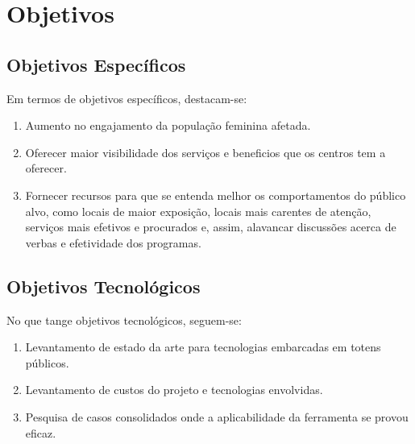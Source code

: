 \section{Objetivos}
\vspace*{1cm}
\subsection{Objetivos Específicos}
Em termos de objetivos específicos, destacam-se:
\begin{enumerate}
\item Aumento no engajamento da população feminina afetada.
\item Oferecer maior visibilidade dos serviços e beneficios que os centros tem a oferecer.
\item Fornecer recursos para que se entenda melhor os comportamentos do público alvo, como locais de maior exposição, locais mais carentes de atenção, serviços mais efetivos e procurados e, assim, alavancar discussões acerca de verbas e efetividade dos programas.
\end{enumerate}
\subsection{Objetivos Tecnológicos}
No que tange objetivos tecnológicos, seguem-se:
\begin{enumerate}
\item Levantamento de estado da arte para tecnologias embarcadas em totens públicos.
\item Levantamento de custos do projeto e tecnologias envolvidas.
\item Pesquisa de casos consolidados onde a aplicabilidade da ferramenta se provou eficaz.
\end{enumerate}
\newpage 